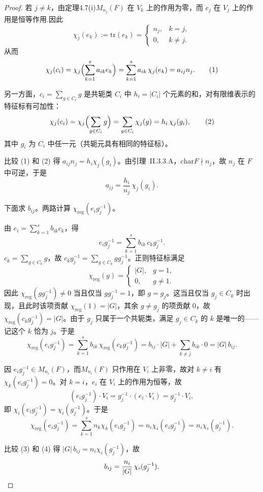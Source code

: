 \documentclass[11pt,a4paper]{article}
\theoremstyle{plain}
\theoremstyle{definition}
\begin{document}
\begin{proof}
若 $j \neq k$，由定理4.7(i)$M_{n_j}(F)$ 在 $V_k$ 上的作用为零，而 $e_j$ 在 $V_j$ 上的作用是恒等作用.因此
$$
\chi_j(e_k) := \mathrm{tr}(e_k) = \begin{cases}
n_j, & k = j, \\
0, & k \neq j.
\end{cases}
$$
从而
\[
\chi_j(c_i) = \chi_j \Bigl( \sum_{k=1}^s a_{ik}e_k \Bigr) = \sum_{k=1}^s a_{ik}\, \chi_j(e_k) = a_{ij}n_j. \tag{1}
\]

另一方面，$c_i = \sum_{g \in C_i} g$ 是共轭类 $C_i$ 中 $h_i = |C_i|$ 个元素的和，对有限维表示的特征标有可加性：
\[
\chi_j(c_i) = \chi_j\Bigl(\sum_{g \in C_i} g\Bigr) = \sum_{g \in C_i} \chi_j(g) = h_i\, \chi_j(g_i), \tag{2}
\]
其中 $g_i$ 为 $C_i$ 中任一元（共轭元具有相同的特征标）。

比较 (1) 和 (2) 得 $a_{ij} n_j = h_i \chi_j(g_i)$。由引理~II.3.3.A，$\mathrm{char}F \nmid n_j$，故 $n_j$ 在 $F$ 中可逆，于是
\[
a_{ij} = \frac{h_i}{n_j}\,\chi_j(g_i).
\]

\noindent 下面求 $b_{ij}$。两路计算 $\chi_{\mathrm{reg}}(e_i g_j^{-1})$。

\smallskip
\noindent{} 由 $e_i = \sum_{k=1}^s b_{ik} c_k$，得
\[
e_i g_j^{-1} = \sum_{k=1}^s b_{ik}\, c_k g_j^{-1}.
\]
$c_k = \sum_{g \in C_k} g$，故 $c_k g_j^{-1} = \sum_{g \in C_k} g g_j^{-1}$。正则特征标满足
\[
\chi_{\mathrm{reg}}(g) = \begin{cases} |G|, & g = 1, \\ 0, & g \neq 1. \end{cases}
\]
因此 $\chi_{\mathrm{reg}}(g g_j^{-1}) \neq 0$ 当且仅当 $g g_j^{-1} = 1$，即 $g = g_j$。这当且仅当 $g_j \in C_k$ 时出现，且此时该项贡献 $\chi_{\mathrm{reg}}(1) = |G|$，其余 $g \neq g_j$ 的项贡献 $0$，故 $\chi_{\mathrm{reg}}(c_k g_j^{-1}) = |G|$。由于 $g_j$ 只属于一个共轭类，满足 $g_j \in C_k$ 的 $k$ 是唯一的——记这个 $k$ 恰为 $j$。于是
\[
\chi_{\mathrm{reg}}(e_i g_j^{-1})
= \sum_{k=1}^s b_{ik}\, \chi_{\mathrm{reg}}(c_k g_j^{-1})
= b_{ij} \cdot |G| + \sum_{k \neq j} b_{ik} \cdot 0
= |G|\, b_{ij}. \tag{3}
\]

\smallskip
\noindent{} 因 $e_i g_j^{-1} \in M_{n_i}(F)$，而$M_{n_i}(F)$ 只作用在 $V_i$ 上非零，故对 $k \neq i$ 有 $\chi_k(e_i g_j^{-1}) = 0$。对 $k = i$，$e_i$ 在 $V_i$ 上的作用为恒等，故
\[
(e_i g_j^{-1}) \cdot V_i = g_j^{-1} \cdot (e_i \cdot V_i) = g_j^{-1} \cdot V_i,
\]
即 $\chi_i(e_i g_j^{-1}) = \chi_i(g_j^{-1})$。于是
\[
\chi_{\mathrm{reg}}(e_i g_j^{-1})
= \sum_{k=1}^s n_k \chi_k(e_i g_j^{-1})
= n_i \chi_i(e_i g_j^{-1})
= n_i \chi_i(g_j^{-1}). \tag{4}
\]

\smallskip
\noindent 比较 (3) 和 (4) 得 $|G|\, b_{ij} = n_i \chi_i(g_j^{-1})$，故
\begin{equation*}
b_{ij} = \frac{n_i}{|G|}\,\chi_i(g_j^{-1}). \qedhere
\end{equation*}
\end{proof}
\end{document}
